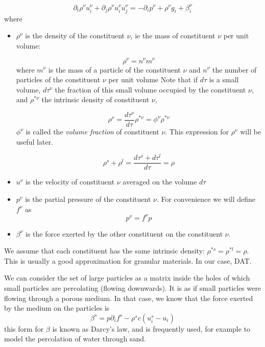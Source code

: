 \documentclass[11pt]{book}
\begin{document}
\begin{equation} \label{eq:mom_bal}
	\partial_t \rho^\nu u_i^\nu + \partial_j \rho^\nu u_i^\nu u_j^\nu = -\partial_i p^\nu + \rho^\nu g_i + \beta^\nu_i 
\end{equation}
where
\begin{itemize}
\item $\rho^\nu$ is the density of the constituent $\nu$, ie the mass of constituent $\nu$ per unit volume:

\[
\rho^\nu = n^\nu m^\nu
\]
where $m^\nu$ is the mass of a particle of the constituent $\nu$ and $n^\nu$ the number of particles of the constituent $\nu$ per unit volume
Note that if $d\tau$ is a small volume, $d\tau^\nu$ the fraction of this small volume occupied by the constituent $\nu$, and $\rho^{*\nu}$ the intrinsic density of constituent $\nu$, 

\begin{equation} \label{eq:1}
\rho^\nu = \frac{d\tau^\nu}{d\tau} \rho^{*\nu} = \phi^{\nu} \rho^{*\nu}
\end{equation}
$\phi^\nu$ is called the \textit{volume fraction} of constituent $\nu$. This expression for $\rho^\nu$ will be useful later.

\[
\rho^s + \rho^l = \frac{d\tau^s + d\tau^l}{d\tau} = \rho
\]

\item $u^\nu$ is the velocity of constituent $\nu$ averaged on the volume $d\tau$

\item $p^\nu$ is the partial pressure of the constituent $\nu$. For convenience we will define $f^\nu$ as
\begin{equation}
p^\nu = f^\nu p
\end{equation}

\item $\beta^\nu$ is the force exerted by the other constituent on the constituent $\nu$.
\end{itemize}

We assume that each constituent has the same intrinsic density: $\rho^{*s}=\rho^{*l}=\rho$. This is usually a good approximation for granular materials. In our case, DAT.

We can consider the set of large particles as a matrix inside the holes of which small particles are percolating (flowing downwards).
It is as if small particles were flowing through a porous medium. In that case, we know that the force exerted by the medium on the particles is 
\begin{equation}
\beta^s = p \partial_i f^s - \rho^s c (u^s_i - u_i)
\end{equation}
this form for $\beta$ is known as Darcy's law, and is frequently used, for example to model the percolation of water through sand.
\end{document}
